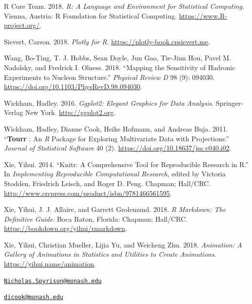 \leavevmode\hypertarget{ref-r_core_team_r:_2018}{}%
R Core Team. 2018. \emph{R: A Language and Environment for Statistical
Computing}. Vienna, Austria: R Foundation for Statistical Computing.
\url{https://www.R-project.org/}.

\leavevmode\hypertarget{ref-sievert_plotly_2018}{}%
Sievert, Carson. 2018. \emph{Plotly for R}.
\url{https://plotly-book.cpsievert.me}.

\leavevmode\hypertarget{ref-wang_mapping_2018}{}%
Wang, Bo-Ting, T. J. Hobbs, Sean Doyle, Jun Gao, Tie-Jiun Hou, Pavel M.
Nadolsky, and Fredrick I. Olness. 2018. ``Mapping the Sensitivity of
Hadronic Experiments to Nucleon Structure.'' \emph{Physical Review D} 98
(9): 094030. \url{https://doi.org/10.1103/PhysRevD.98.094030}.

\leavevmode\hypertarget{ref-wickham_ggplot2:_2016}{}%
Wickham, Hadley. 2016. \emph{Ggplot2: Elegant Graphics for Data
Analysis}. Springer-Verlag New York. \url{http://ggplot2.org}.

\leavevmode\hypertarget{ref-wickham_tourr_2011}{}%
Wickham, Hadley, Dianne Cook, Heike Hofmann, and Andreas Buja. 2011.
``\textbf{Tourr} : An \emph{R} Package for Exploring Multivariate Data
with Projections.'' \emph{Journal of Statistical Software} 40 (2).
\url{https://doi.org/10.18637/jss.v040.i02}.

\leavevmode\hypertarget{ref-stodden_knitr:_2014}{}%
Xie, Yihui. 2014. ``Knitr: A Comprehensive Tool for Reproducible
Research in R.'' In \emph{Implementing Reproducible Computational
Research}, edited by Victoria Stodden, Friedrich Leisch, and Roger D.
Peng. Chapman; Hall/CRC.
\url{http://www.crcpress.com/product/isbn/9781466561595}.

\leavevmode\hypertarget{ref-xie_r_2018}{}%
Xie, Yihui, J. J. Allaire, and Garrett Grolemund. 2018. \emph{R
Markdown: The Definitive Guide}. Boca Raton, Florida: Chapman; Hall/CRC.
\url{https://bookdown.org/yihui/rmarkdown}.

\leavevmode\hypertarget{ref-xie_animation:_2018}{}%
Xie, Yihui, Christian Mueller, Lijia Yu, and Weicheng Zhu. 2018.
\emph{Animation: A Gallery of Animations in Statistics and Utilities to
Create Animations}. \url{https://yihui.name/animation}.



\address{%
Nicholas Spyrison\\
Monash University\\
Faculty of Information Technology\\
}
\href{mailto:Nicholas.Spyrison@monash.edu}{\nolinkurl{Nicholas.Spyrison@monash.edu}}

\address{%
Dianne Cook\\
Monash University\\
Department of Econometrics and Business Statistics\\
}
\href{mailto:dicook@monash.edu}{\nolinkurl{dicook@monash.edu}}

